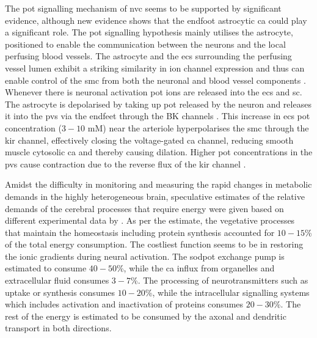 The \gls{pot} signalling mechanism of \gls{nvc} seems to be supported by significant evidence, although new evidence shows that the endfoot astrocytic \gls{ca} could play a significant role. The \gls{pot} signalling hypothesis mainly utilises the astrocyte,  positioned to enable the communication between the neurons and the local perfusing blood vessels. The astrocyte and the \glspl{ec} surrounding the perfusing vessel lumen exhibit a striking similarity in ion channel expression and thus can enable control of the \gls{smc} from both the neuronal and blood vessel components \citep{Longden2015}. Whenever there is neuronal activation \gls{pot} ions are released into the \gls{ecs} and \gls{sc}. The astrocyte is depolarised by taking up \gls{pot} released by the neuron and releases it into the \gls{pvs} via the endfeet through the BK channels \citep{Filosa2007}. This increase in \gls{ecs} \gls{pot} concentration ($3-10$ mM) near the arteriole hyperpolarises the \gls{smc} through the \gls{kir} channel, effectively closing the voltage-gated \gls{ca} channel, reducing smooth muscle cytosolic \gls{ca} and thereby causing dilation. Higher \gls{pot} concentrations in the \gls{pvs} cause contraction due to the reverse flux of the \gls{kir} channel \citep{Farr2011}. 

Amidst the difficulty in monitoring and measuring the rapid changes in metabolic demands in the highly heterogeneous brain, speculative estimates of the relative demands of the cerebral processes that require energy were given based on different experimental data by \citet{Ames2000}. As per the estimate, the vegetative processes that maintain the homeostasis including protein synthesis accounted for $10-15$\% of the total energy consumption. The costliest function seems to be in  restoring the ionic gradients during neural activation. The \gls{sodpot} exchange pump is estimated to consume $40-50$\%, while the \gls{ca} influx from organelles and extracellular fluid consumes $3-7$\%. The processing of neurotransmitters such as uptake or synthesis consumes $10-20$\%, while the intracellular signalling systems which includes activation and inactivation of proteins consumes $20-30$\%. The rest of the energy is estimated to be consumed by the axonal and dendritic transport in both directions.


